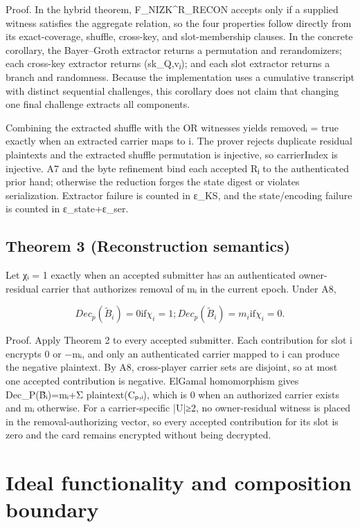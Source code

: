 \documentclass[11pt]{article}
\begin{document}
Proof. In the hybrid theorem, F\_NIZK\^{}R\_RECON accepts only if a supplied witness satisfies the aggregate relation, so the four properties follow directly from its exact-coverage, shuffle, cross-key, and slot-membership clauses. In the concrete corollary, the Bayer–Groth extractor returns a permutation and rerandomizers; each cross-key extractor returns (sk\_Q,vⱼ); and each slot extractor returns a branch and randomness. Because the implementation uses a cumulative transcript with distinct sequential challenges, this corollary does not claim that changing one final challenge extracts all components.

Combining the extracted shuffle with the OR witnesses yields removedᵢ = true exactly when an extracted carrier maps to i. The prover rejects duplicate residual plaintexts and the extracted shuffle permutation is injective, so carrierIndex is injective. A7 and the byte refinement bind each accepted Rⱼ to the authenticated prior hand; otherwise the reduction forges the state digest or violates serialization. Extractor failure is counted in ε\_KS, and the state/encoding failure is counted in ε\_state+ε\_ser.

\subsection*{Theorem 3 (Reconstruction semantics)}

Let χᵢ = 1 exactly when an accepted submitter has an authenticated owner-residual carrier that authorizes removal of mᵢ in the current epoch. Under A8,

\begin{displaymath}Dec_{p}(\tilde{B}_{i}) = 0  \text{if} \chi _{i} = 1;      Dec_{p}(\tilde{B}_{i}) = m_{i}  \text{if} \chi _{i} = 0.\end{displaymath}

Proof. Apply Theorem 2 to every accepted submitter. Each contribution for slot i encrypts 0 or −mᵢ, and only an authenticated carrier mapped to i can produce the negative plaintext. By A8, cross-player carrier sets are disjoint, so at most one accepted contribution is negative. ElGamal homomorphism gives Dec\_P(B̃ᵢ)=mᵢ+Σ plaintext(Cₚ,ᵢ), which is 0 when an authorized carrier exists and mᵢ otherwise. For a carrier-specific |U|≥2, no owner-residual witness is placed in the removal-authorizing vector, so every accepted contribution for its slot is zero and the card remains encrypted without being decrypted.

\section{Ideal functionality and composition boundary}
\end{document}
